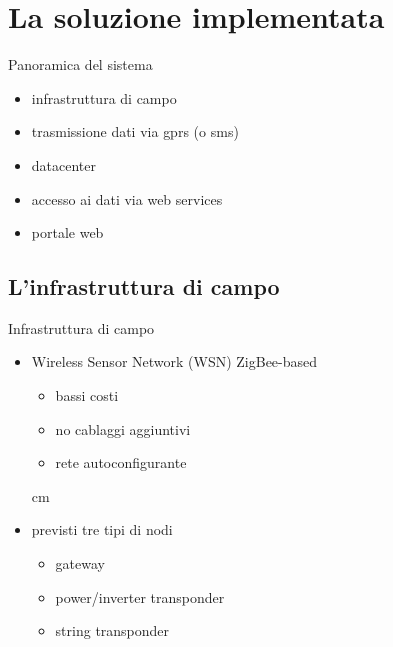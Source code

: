 \documentclass{beamer}
\newcommand{\N}{\vskip 0.3 cm}
\newcommand{\red}[1]{\textcolor[rgb]{.8,0,0}{#1}}
\begin{document}
%
\section{La soluzione implementata}
\begin{frame}{Panoramica del sistema}
%
\begin{figure}[!h]
  \begin{center}
  \end{center}
\end{figure}
%
\begin{itemize}
\item infrastruttura \red{di campo}
\item trasmissione dati via \red{gprs} (o \red{sms})
\item \red{datacenter}
\item accesso ai dati via \red{web services}
\item portale web
\end{itemize}
%
\end{frame}
%

%
\subsection{L'infrastruttura di campo}
\begin{frame}{Infrastruttura di campo}
%
\begin{itemize}
  \item \red{Wireless Sensor Network} (WSN) ZigBee-based
    \begin{itemize}
    \item bassi costi
    \item no cablaggi aggiuntivi
    \item rete autoconfigurante
    \end{itemize}
    \N
  \item previsti tre tipi di nodi
    \begin{itemize}
    \item \red{gateway}
    \item \red{power/inverter transponder}
    \item \red{string transponder}
    \end{itemize}
\end{itemize}
%
\end{frame}
%
\end{document}
